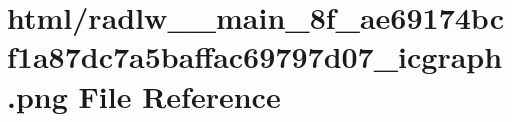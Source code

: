 \hypertarget{radlw____main__8f__ae69174bcf1a87dc7a5baffac69797d07__icgraph_8png}{}\section{html/radlw\+\_\+\+\_\+main\+\_\+8f\+\_\+ae69174bcf1a87dc7a5baffac69797d07\+\_\+icgraph.png File Reference}
\label{radlw____main__8f__ae69174bcf1a87dc7a5baffac69797d07__icgraph_8png}
